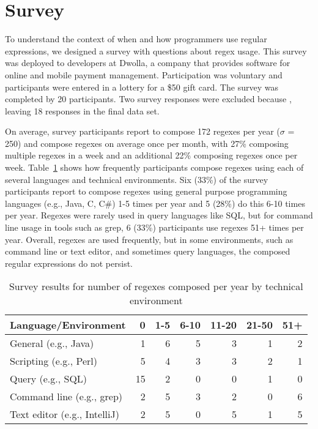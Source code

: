 \section{Survey}
\label{sec:survey}

To understand the context of when and how programmers use regular expressions, 
we designed a survey with  questions about regex usage. This survey was 
deployed to developers at Dwolla, a company that provides software for
 online and mobile payment management. 
Participation was voluntary and participants were entered in a lottery for a \$50 gift card. 
The survey was completed by 20 participants. Two survey responses were excluded
because , leaving 18 responses in the final data set. 


On average, survey participants report to compose 172 regexes per year ($\sigma$ = 250) and compose regexes on average once per month, with 27\% composing multiple regexes in a week and an additional 22\% composing regexes once per week. 
Table~\ref{tab:regexenviron} shows how frequently participants compose regexes using each of several languages and technical environments. 
Six (33\%) of the survey participants report to compose regexes using general purpose programming languages (e.g., Java, C, C\#) 1-5 times per year and 5 (28\%) do this 6-10 times per year.  Regexes were rarely used in query languages like SQL, but for command line usage in tools such as grep, 6 (33\%) participants use regexes 51+ times per year. Overall, regexes are used frequently, but in some environments, such as command line or text editor, and sometimes query languages, the composed regular expressions do not persist. 

\newcommand{\horiz}{\hspace{2.1pt}}

\begin{table}
\caption{Survey results for number of regexes composed per year by technical environment \label{tab:regexenviron}}
\begin{center}
\begin{small}
\begin{tabular}{l | r @{  \horiz} r @{ \horiz } r @{ \horiz } r @{ \horiz } r @{ \horiz } r }
Language/Environment & 0 & 1-5 & 6-10 & 11-20 & 21-50 & 51+ \\ \hline
General  (e.g., Java)  & 1 & 6 & 5 & 3& 1& 2 \\
Scripting  (e.g., Perl) &5 &4 &3 &3 &2  &1 \\
Query  (e.g., SQL) & 15&2 &0 &0 &1  & 0\\
Command line (e.g., grep)   &2 &5 &3 &2 &0  &6 \\
Text editor (e.g., IntelliJ)   & 2& 5& 0& 5& 1& 5\\
\end{tabular}
\end{small}
\end{center}
\end{table}

